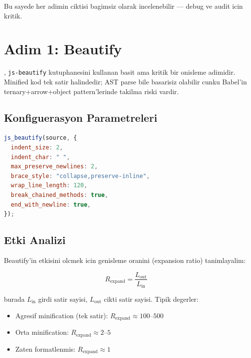 Bu sayede her adimin ciktisi bagimsiz olarak incelenebilir --- debug ve audit icin kritik.


\section{Adim 1: Beautify}
\label{sec:beautify}

, \texttt{js-beautify} kutuphanesini kullanan basit ama kritik bir onisleme adimidir. Minified kod tek satir halindedir; AST parse bile basa\-ri\-siz olabilir cunku Babel'in ternary+arrow+object pattern'lerinde takilma riski vardir.

\subsection{Konfiguerasyon Parametreleri}

\begin{lstlisting}[language=JavaScript, caption={js-beautify konfigurasyonu -- beautify.mjs}]
js_beautify(source, {
  indent_size: 2,
  indent_char: " ",
  max_preserve_newlines: 2,
  brace_style: "collapse,preserve-inline",
  wrap_line_length: 120,
  break_chained_methods: true,
  end_with_newline: true,
});
\end{lstlisting}

\subsection{Etki Analizi}

Beautify'in etkisini olcmek icin genisleme oranini (expansion ratio) tanimlayalim:

\begin{equation}
R_{\text{expand}} = \frac{L_{\text{out}}}{L_{\text{in}}}
\end{equation}

burada $L_{\text{in}}$ girdi satir sayisi, $L_{\text{out}}$ cikti satir sayisi. Tipik degerler:

\begin{itemize}
\item Agresif minification (tek satir): $R_{\text{expand}} \approx 100\text{--}500$
\item Orta minification: $R_{\text{expand}} \approx 2\text{--}5$
\item Zaten formatlenmis: $R_{\text{expand}} \approx 1$
\end{itemize}

